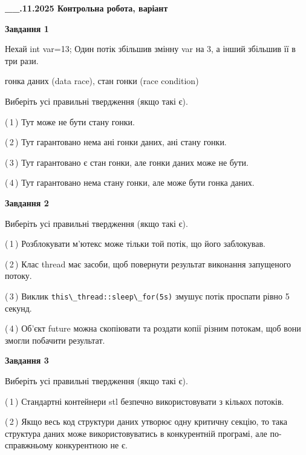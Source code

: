 \documentclass[12pt, ukrainian]{article}
\def\code#1{\Verb!#1!}
\begin{document}
\begin {large}

\textbf{\_\_.11.2025 Контрольна робота, варіант  }\par


{

\begin{center}
\textbf{Завдання 1}
\end{center}
Нехай int var=13; Один потік збільшив змінну var на 3, а інший збільшив її в три рази.

гонка даних (data race), стан гонки (race condition)

Виберіть усі правильні твердження (якщо такі є).\par
\vspace{2mm}
(\,1\,) Тут може не бути стану гонки.%

(\,2\,) Тут гарантовано нема ані гонки даних, ані стану гонки.%

(\,3\,) Тут гарантовано є стан гонки, але гонки даних може не бути.%

(\,4\,) Тут гарантовано нема стану гонки, але може бути гонка даних.%



\begin{center}
\textbf{Завдання 2}
\end{center}
Виберіть усі правильні твердження (якщо такі є).\par
\vspace{2mm}

(\,1\,) Розблокувати м’ютекс може тільки той потік, що його заблокував.%

(\,2\,) Клас thread має засоби, щоб повернути результат виконання запущеного потоку.%

(\,3\,) Виклик \code{this\_thread::sleep\_for(5s)} змушує потік проспати рівно 5 секунд.%

(\,4\,) Об’єкт future можна скопіювати та роздати копії різним потокам, щоб вони змогли побачити результат.%



\begin{center}
\textbf{Завдання 3}
\end{center}
Виберіть усі правильні твердження (якщо такі є).\par
\vspace{2mm}

(\,1\,) Стандартні контейнери stl безпечно використовувати з кількох потоків.%

(\,2\,) Якщо весь код структури даних утворює одну критичну секцію, то така структура даних може використовуватись в конкурентній програмі, але по-справжньо\-му конкурентною не є.%

}
\end{large}
\end{document}

